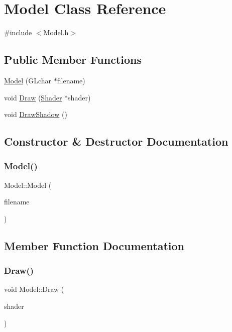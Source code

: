 \hypertarget{class_model}{}\section{Model Class Reference}
\label{class_model}


{\ttfamily \#include $<$Model.\+h$>$}

\subsection*{Public Member Functions}
\begin{DoxyCompactItemize}
\item 
\mbox{\hyperlink{class_model_a0521de97cb482940ccf4a416d35fa336}{Model}} (G\+Lchar $\ast$filename)
\item 
void \mbox{\hyperlink{class_model_a8444e404fcc9cc66827c2f628b92ece3}{Draw}} (\mbox{\hyperlink{class_shader}{Shader}} $\ast$shader)
\item 
void \mbox{\hyperlink{class_model_ac2e396a05a6b7af011c213dcbd2dae21}{Draw\+Shadow}} ()
\end{DoxyCompactItemize}


\subsection{Constructor \& Destructor Documentation}
\mbox{\label{class_model_a0521de97cb482940ccf4a416d35fa336}} 
\subsubsection{\texorpdfstring{Model()}{Model()}}
{\footnotesize\ttfamily Model\+::\+Model (\begin{DoxyParamCaption}\item[{G\+Lchar $\ast$}]{filename }\end{DoxyParamCaption})}



\subsection{Member Function Documentation}
\mbox{\label{class_model_a8444e404fcc9cc66827c2f628b92ece3}} 
\subsubsection{\texorpdfstring{Draw()}{Draw()}}
{\footnotesize\ttfamily void Model\+::\+Draw (\begin{DoxyParamCaption}\item[{\mbox{\hyperlink{class_shader}{Shader}} $\ast$}]{shader }\end{DoxyParamCaption})}

